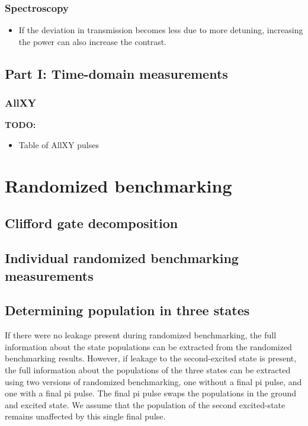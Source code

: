     \subsubsection{Spectroscopy}
      \begin{itemize}
        \item If the deviation in transmission becomes less due to more detuning, increasing the power can also increase the contrast.
      \end{itemize}
  \subsection{Part I: Time-domain measurements}
    \subsubsection{AllXY}
      \label{ssec:AllXY}
      \textbf{TODO:}
      \begin{itemize}
        \item Table of AllXY pulses
      \end{itemize}
\section{Randomized benchmarking}
  \subsection{Clifford gate decomposition}
    \label{ssec:Clifford gate decomposition}
  \subsection{Individual randomized benchmarking measurements}
    \label{ssec:Individual randomized benchmarking measurements}

  \subsection{Determining population in three states}
    \label{ssec:Determining population in three states}
    If there were no leakage present during randomized benchmarking, the full information about the state populations can be extracted from the randomized benchmarking results. However, if leakage to the second-excited state is present, the full information about the populations of the three states can be extracted using two versions of randomized benchmarking, one without a final pi pulse, and one with a final pi pulse. The final pi pulse swaps the populations in the ground and excited state. We assume that the population of the second excited-state remains unaffected by this single final pulse.

